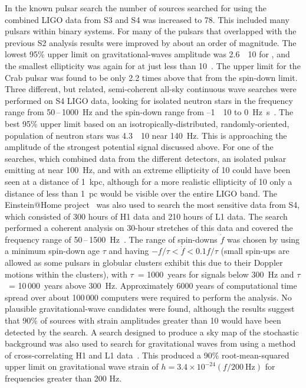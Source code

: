 \documentclass{article}
\begin{document}
In the known pulsar search the number of sources searched for using the combined
LIGO data from S3 and S4 was increased to 78. This included many pulsars within
binary systems. For many of the pulsars that overlapped with the previous S2
analysis results were improved by about an order of magnitude. The lowest 95\%
upper limit on gravitational-waves amplitude was 2.6~\texttimes~10 for
, and the smallest ellipticity was again for 
at just less than 10~\cite{Abbott:2007d}. The upper limit for the Crab
pulsar was found to be only 2.2 times above that from the spin-down limit. Three
different, but related, semi-coherent all-sky continuous wave searches were
performed on S4 LIGO data, looking for isolated neutron stars in the frequency
range from 50\,--\,1000~Hz and the spin-down range from --1~\texttimes~10
to 0~Hz~s~\cite{Abbott:2008e}. The best 95\% upper limit based on an
isotropically-distributed, randomly-oriented, population of neutron stars was
4.3~\texttimes~10 near 140~Hz. This is approaching the amplitude of the
strongest potential signal discussed above. For one of the searches, which
combined data from the different detectors, an isolated pulsar emitting at near
100~Hz, and with an extreme ellipticity of 10 could have been seen at a
distance of 1~kpc, although for a more realistic ellipticity of 10 only
a distance of less than 1~pc would be visible over the entire LIGO band. The
Einstein@Home project~\cite{eath} was also used to search the most sensitive
data from S4, which consisted of 300 hours of H1 data and 210 hours of L1 data.
The search performed a coherent analysis on 30-hour stretches of this data and
covered the frequency range of 50\,--\,1500~Hz~\cite{Abbott:2008f}. The range
of spin-downs $\dot{f}$ was chosen by using a minimum spin-down age $\tau$ and
having $-f/\tau < \dot{f} < 0.1f/\tau$ (small spin-ups are allowed as some
pulsars in globular clusters exhibit this due to their Doppler motions within
the clusters), with $\tau$~= 1000~years for signals below 300~Hz and
$\tau$~= 10\,000~years above 300~Hz. Approximately 6000 years of computational time
spread over about 100\,000 computers were required to perform the analysis. No
plausible gravitational-wave candidates were found, although the results suggest
that 90\% of sources with strain amplitudes greater than 10 would have
been detected by the search. A search designed to produce a sky map of the
stochastic background was also used to search for gravitational waves from
 using a method of cross-correlating H1 and L1 data~\cite{Abbott:2007f}.
This produced a 90\% root-mean-squared upper limit on gravitational wave strain
of $h = 3.4\times10^{-24}(f/200 \mathrm{\ Hz})$ for frequencies greater than 200 Hz.
\end{document}
